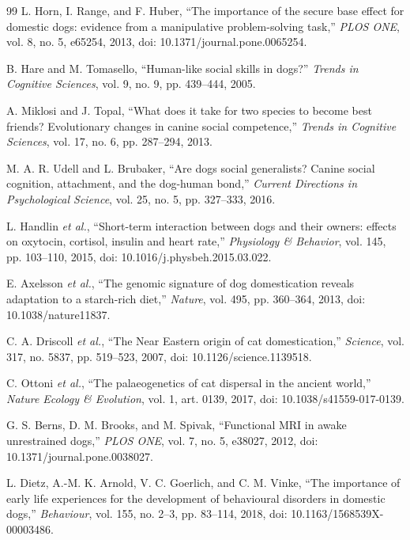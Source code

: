 \documentclass[conference]{IEEEtran}
\begin{document}
\begin{thebibliography}{99}
L. Horn, I. Range, and F. Huber, ``The importance of the secure base effect for domestic dogs: evidence from a manipulative problem-solving task,'' \emph{PLOS ONE}, vol. 8, no. 5, e65254, 2013, doi: 10.1371/journal.pone.0065254.

B. Hare and M. Tomasello, ``Human-like social skills in dogs?'' \emph{Trends in Cognitive Sciences}, vol. 9, no. 9, pp. 439--444, 2005.

A. Miklosi and J. Topal, ``What does it take for two species to become best friends? Evolutionary changes in canine social competence,'' \emph{Trends in Cognitive Sciences}, vol. 17, no. 6, pp. 287--294, 2013.

M. A. R. Udell and L. Brubaker, ``Are dogs social generalists? Canine social cognition, attachment, and the dog-human bond,'' \emph{Current Directions in Psychological Science}, vol. 25, no. 5, pp. 327--333, 2016.

L. Handlin \emph{et al.}, ``Short-term interaction between dogs and their owners: effects on oxytocin, cortisol, insulin and heart rate,'' \emph{Physiology \& Behavior}, vol. 145, pp. 103--110, 2015, doi: 10.1016/j.physbeh.2015.03.022.

E. Axelsson \emph{et al.}, ``The genomic signature of dog domestication reveals adaptation to a starch-rich diet,'' \emph{Nature}, vol. 495, pp. 360--364, 2013, doi: 10.1038/nature11837.

C. A. Driscoll \emph{et al.}, ``The Near Eastern origin of cat domestication,'' \emph{Science}, vol. 317, no. 5837, pp. 519--523, 2007, doi: 10.1126/science.1139518.

C. Ottoni \emph{et al.}, ``The palaeogenetics of cat dispersal in the ancient world,'' \emph{Nature Ecology \& Evolution}, vol. 1, art. 0139, 2017, doi: 10.1038/s41559-017-0139.

G. S. Berns, D. M. Brooks, and M. Spivak, ``Functional MRI in awake unrestrained dogs,'' \emph{PLOS ONE}, vol. 7, no. 5, e38027, 2012, doi: 10.1371/journal.pone.0038027.

L. Dietz, A.-M. K. Arnold, V. C. Goerlich, and C. M. Vinke, ``The importance of early life experiences for the development of behavioural disorders in domestic dogs,'' \emph{Behaviour}, vol. 155, no. 2--3, pp. 83--114, 2018, doi: 10.1163/1568539X-00003486.

\end{thebibliography}
\end{document}
